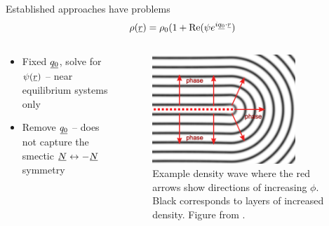 \documentclass[10pt,mathserif]{beamer}
\newcommand{\suf}[2]{\stackunder[0.5pt]{\stackunder[1pt]{\ensuremath{#1}}{\rule{\widthof{\ensuremath{#2}}*\real{0.9}}{.1ex}}}{}}
\newcommand{\su}[1]{\suf{#1}{#1}}
\newcommand{\ssu}[1]{\scriptsize\su{#1}\normalsize}
\newcommand{\NN}{\ensuremath{\su{N}}}
\begin{document}
\begin{frame}[fragile]{Established approaches have problems}
    \newrefsection
    \vspace{-\fill}
    \begin{equation*}
        \rho(\su{r}) = \rho_0 (1 + \Re(\psi e^{i\ssu{q_0} \cdot \ssu{r}})
    \end{equation*}
    \vspace{\fill}

    \begin{columns}
        \begin{column}{0.49\textwidth}
            \begin{itemize}
                \item Fixed $\su{q_0}$, solve for $\psi(\su{r})$ -- near equilibrium systems only
                \item Remove $\su{q_0}$ -- does not capture the smectic $\NN\leftrightarrow-\NN$ symmetry\cite{pevnyiModelingSmecticLayers2014}
            \end{itemize}
        \end{column}
        \begin{column}{0.60\textwidth}
            \begin{figure}
                \includegraphics[width=0.8\textwidth]{figures/pevnyi.pdf}
                \caption{
                    Example density wave where the red arrows show directions of increasing $\phi$.
                    Black corresponds to layers of increased density.
                    Figure from \cite{pevnyiModelingSmecticLayers2014}.
                }
            \end{figure}
        \end{column}
    \end{columns}
    \vspace{\fill}
    \printbibliography[heading=none]
    \vspace{-\fill}
\end{frame}
\end{document}
